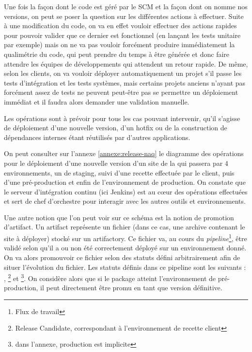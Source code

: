 Une fois la façon dont le code est géré par le \gls{SCM} et la façon dont on nomme nos versions, on peut se poser la question sur les différentes actions à effectuer. Suite à une modification du code, on va en effet vouloir effectuer des actions rapides pour pouvoir valider que ce dernier est fonctionnel (en lançant les tests unitaire par exemple) mais on ne va pas vouloir forcément produire immédiatement la qualimétrie du code, qui peut prendre du temps à être générée et donc faire attendre les équipes de développements qui attendent un retour rapide. De même, selon les clients, on va vouloir déployer automatiquement un projet s'il passe les tests d'intégration et les tests systèmes, mais certains projets anciens n'ayant pas forcément assez de tests ne peuvent peut-être pas se permettre un déploiement immédiat et il faudra alors demander une validation manuelle.

Les opérations sont à prévoir pour tous les cas pouvant intervenir, qu'il s'agisse de déploiement d'une nouvelle version, d'un \gls{hotfix} ou de la construction de dépendances internes étant réutilisés par d'autres applications.

On peut consulter sur l'annexe \ref{annexe:release-naq} le diagramme des opérations pour le déploiement d'une nouvelle version d'un site de la \naq{} qui passera par 4 environnements, un de staging, suivi d'une recette effectuée par le client, puis d'une pré-production et enfin de l'environnement de production. On constate que le serveur d'intégration continu (ici Jenkins) est au cœur des opérations effectuées et sert de chef d'orchestre pour interagir avec les autres outils et environnements.

Une autre notion que l'on peut voir sur ce schéma est la notion de promotion d'artifact. Un artifact représente un fichier (dans ce cas, une archive contenant le site à déployer) stocké sur un \gls{artifactory}. Ce fichier va, au cours du \emph{pipeline}\footnote{Flux de travail}, être validé selon qu'il a ou non été correctement déployé sur un environnement donné. On va alors promouvoir ce fichier selon des statuts défini arbitrairement afin de situer l'évolution du fichier. Les statuts définis dans ce pipeline sont les suivants : , \footnote{Release Candidate, correspondant à l'environnement de recette client} et \footnote{dans l'annexe, production est implicite}. On considère alors que si le package atteint l'environnement de pré-production, il peut directement être promu en tant que version définitive.

